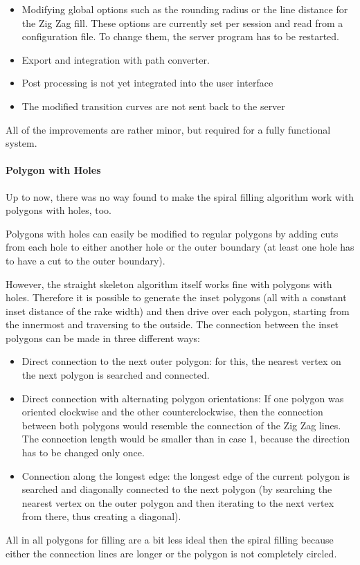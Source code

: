 \begin{itemize}
\item Modifying global options such as the rounding radius or the line distance for the Zig Zag fill. These options are currently set per session and read from a configuration file. To change them, the server program has to be restarted.
\item Export and integration with path converter.
\item Post processing is not yet integrated into the user interface
\item The modified transition curves are not sent back to the server
\end{itemize}

All of the improvements are rather minor, but required for a fully functional system.

\paragraph{Polygon with Holes}

Up to now, there was no way found to make the spiral filling algorithm work with polygons with holes, too. 

Polygons with holes can easily be modified to regular polygons by adding cuts from each hole to either another hole or the outer boundary (at least one hole has to have a cut to the outer boundary).

However, the straight skeleton algorithm itself works fine with polygons with holes. Therefore it is possible to generate the inset polygons (all with a constant inset distance of the rake width) and then drive over each polygon, starting from the innermost and traversing to the outside.
The connection between the inset polygons can be made in three different ways:

\begin{itemize}
\item Direct connection to the next outer polygon: for this, the nearest vertex on the next polygon is searched and connected.
\item Direct connection with alternating polygon orientations: If one polygon was oriented clockwise and the other counterclockwise, then the connection between both polygons would resemble the connection of the Zig Zag lines. The connection length would be smaller than in case 1, because the direction has to be changed only once.
\item Connection along the longest edge: the longest edge of the current polygon is searched and diagonally connected to the next polygon (by searching the nearest vertex on the outer polygon and then iterating to the next vertex from there, thus creating a diagonal).

\end{itemize}
All in all polygons for filling are a bit less ideal then the spiral filling because either the connection lines are longer or the polygon is not completely circled.

